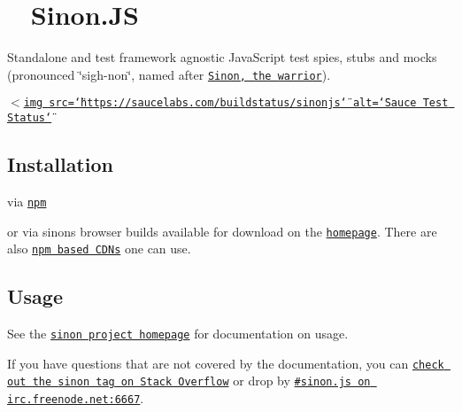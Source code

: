 \section*{\href{https://sinonjs.org}{\tt } ~\newline
 Sinon.\+JS }

Standalone and test framework agnostic Java\+Script test spies, stubs and mocks (pronounced \char`\"{}sigh-\/non\char`\"{}, named after \href{https://en.wikipedia.org/wiki/Sinon}{\tt Sinon, the warrior}). 

\href{https://www.npmjs.com/package/sinon}{\tt } \href{https://gitter.im/sinonjs/sinon?utm_source=badge&amp;utm_medium=badge&amp;utm_campaign=pr-badge&amp;utm_content=badge}{\tt } \href{http://travis-ci.org/sinonjs/sinon}{\tt } \href{https://saucelabs.com/u/sinonjs}{\tt $<$img src=\char`\"{}https\+://saucelabs.\+com/buildstatus/sinonjs\char`\"{} alt=\char`\"{}\+Sauce Test Status\char`\"{}} \href{https://coveralls.io/github/sinonjs/sinon}{\tt } \href{#backers}{\tt } \href{#sponsors}{\tt } \href{https://www.npmjs.com/package/sinon}{\tt } \href{https://cdnjs.com/libraries/sinon.js}{\tt } 

\href{https://saucelabs.com/u/sinonjs}{\tt } 

\subsection*{Installation}

via \href{https://github.com/npm/npm}{\tt npm} 


or via sinon\textquotesingle{}s browser builds available for download on the \href{https://sinonjs.org/releases/}{\tt homepage}. There are also \href{https://sinonjs.org/releases#npm-cdns}{\tt npm based C\+D\+Ns} one can use.

\subsection*{Usage}

See the \href{https://sinonjs.org/}{\tt sinon project homepage} for documentation on usage.

If you have questions that are not covered by the documentation, you can \href{https://stackoverflow.com/questions/tagged/sinon}{\tt check out the {\ttfamily sinon} tag on Stack Overflow} or drop by \href{irc://irc.freenode.net:6667/sinon.js}{\tt \#sinon.\+js on irc.\+freenode.\+net\+:6667}.

